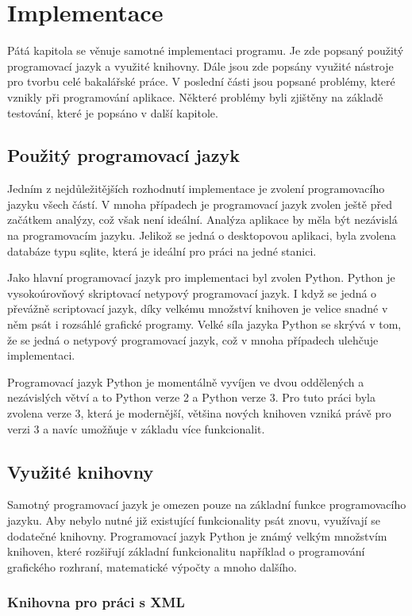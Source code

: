 \documentclass[thesis=B,czech]{resources/FITthesis}[2012/06/26]
\begin{document}
\chapter{Implementace}
Pátá kapitola se věnuje samotné implementaci programu. Je zde popsaný použitý programovací jazyk a využité knihovny.  Dále jsou zde popsány využité nástroje pro tvorbu celé bakalářské práce. V poslední části jsou popsané problémy, které vznikly při programování aplikace. Některé problémy byli zjištěny na základě testování, které je popsáno v další kapitole.

\section{Použitý programovací jazyk}
Jedním z nejdůležitějších rozhodnutí implementace je zvolení programovacího jazyku všech částí. V mnoha případech je programovací jazyk zvolen ještě před začátkem analýzy, což však není ideální. Analýza aplikace by měla být nezávislá na programovacím jazyku. Jelikož se jedná o desktopovou aplikaci, byla zvolena databáze typu sqlite, která je ideální pro práci na jedné stanici. \par

Jako hlavní programovací jazyk pro implementaci byl zvolen Python. Python je vysokoúrovňový skriptovací netypový programovací jazyk. I když se jedná o převážně scriptovací jazyk, díky velkému množství knihoven je velice snadné v něm psát i rozsáhlé grafické programy. Velké síla jazyka Python se skrývá v tom, že se jedná o netypový programovací jazyk, což v mnoha případech ulehčuje implementaci. \par

Programovací jazyk Python je momentálně vyvíjen ve dvou oddělených a nezávislých větví a to Python verze 2 a Python verze 3. Pro tuto práci byla zvolena verze 3, která je modernější, většina nových knihoven vzniká právě pro verzi 3 a navíc umožňuje v základu více funkcionalit.

\section{Využité knihovny}
Samotný programovací jazyk je omezen pouze na základní funkce programovacího jazyku. Aby nebylo nutné již existující funkcionality psát znovu, využívají se dodatečné knihovny. Programovací jazyk Python je známý velkým množstvím knihoven, které rozšiřují základní funkcionalitu například o programování grafického rozhraní, matematické výpočty a mnoho dalšího. 
\subsection{Knihovna pro práci s XML}
\end{document}
